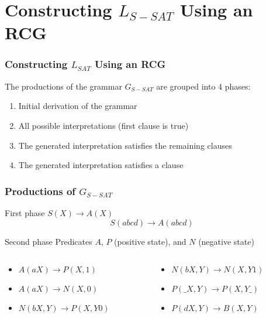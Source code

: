 \documentclass{beamer}
\begin{document}
\section{Constructing $L_{S-SAT}$ Using an RCG}

\begin{frame}
    \frametitle{Constructing $L_{SAT}$ Using an RCG}

    The productions of the grammar $G_{S-SAT}$ are grouped into 4 phases:

    \begin{enumerate}
        \item Initial derivation of the grammar
              \pause
        \item All possible interpretations (first clause is true)
              \pause
        \item The generated interpretation satisfies the remaining clauses
              \pause
        \item The generated interpretation satisfies a clause
    \end{enumerate}
\end{frame}

\begin{frame}
    \frametitle{Productions of $G_{S-SAT}$}

    \begin{block}{First phase}
        $S(X)\to A(X)$
        \pause
        $$S(abcd)\to A(abcd)$$
    \end{block}

    \pause
    \begin{block}{Second phase}
        Predicates $A$, $P$ (positive state), and $N$ (negative state)
        \begin{columns}
            \begin{column}{0.45\textwidth}
                \begin{itemize}
                    \item $A(aX)\to P(X,1)$
                          \pause
                    \item $A(aX)\to N(X,0)$
                          \pause
                    \item $N(bX,Y)\to P(X,Y0)$
                \end{itemize}
            \end{column}
            \pause
            \begin{column}{0.45\textwidth}
                \begin{itemize}
                    \item $N(bX,Y)\to N(X,Y1)$
                          \pause
                    \item $P(\_X,Y)\to P(X,Y\_)$
                          \pause
                    \item $P(dX,Y)\to B(X,Y)$
                \end{itemize}
            \end{column}
        \end{columns}
    \end{block}
\end{frame}
\end{document}
